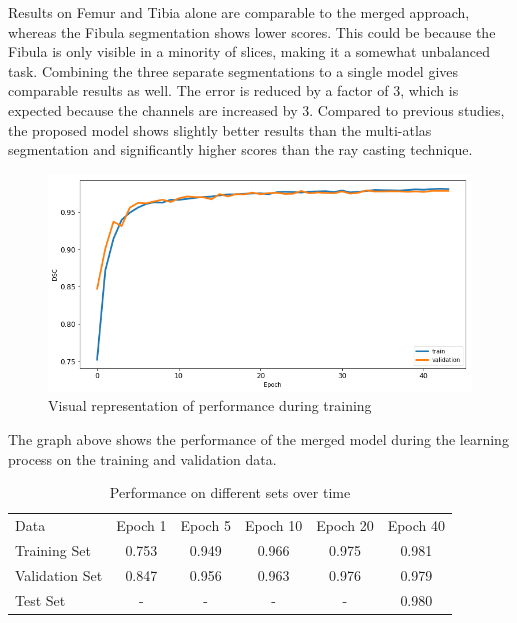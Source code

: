 Results on Femur and Tibia alone are comparable to the merged approach, whereas the Fibula segmentation shows lower scores. This could be because the Fibula is only visible in a minority of slices, making it a somewhat unbalanced task. Combining the three separate segmentations to a single model gives comparable results as well. The error is reduced by a factor of 3, which is expected because the channels are increased by 3. Compared to previous studies, the proposed model shows slightly better results than the multi-atlas segmentation and significantly higher scores than the ray casting technique.

\begin{figure}[H]
  \includegraphics[width=\linewidth]{imgs/train_val.png}
\caption{Visual representation of performance during training}
\end{figure}

The graph above shows the performance of the merged model during the learning process on the training and validation data. 

\begin{table}[H]
    \centering
    \begin{tabular}{| l | c | c | c | c | c |}
    \hline
    Data       & Epoch 1 & Epoch 5 & Epoch 10 & Epoch 20 & Epoch 40 \\ 
    \Xhline{3\arrayrulewidth}
    Training Set   & 0.753   & 0.949   & 0.966    & 0.975    & 0.981 \\
    \hline
    Validation Set & 0.847   & 0.956   & 0.963    & 0.976    & 0.979 \\
    \hline
    Test Set       &     -   &     -   &     -    &     -    & 0.980 \\
    \hline
    \end{tabular}
    \caption{Performance on different sets over time}
\end{table}

